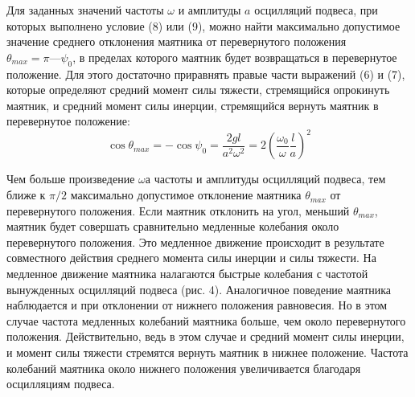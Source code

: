 \documentclass[a4paper,12pt]{article} %
\begin{document}
Для заданных значений частоты $\omega$ и амплитуды $a$ осцилляций подвеса, при которых выполнено условие (8) или (9), можно найти максимально допустимое значение среднего отклонения маятника от перевернутого положения $\theta_{max} = \pi — \psi_0$, в пределах которого маятник будет возвращаться в перевернутое положение. Для этого достаточно приравнять правые части выражений (6) и (7), которые определяют средний момент силы тяжести, стремящийся опрокинуть маятник, и средний момент силы инерции, стремящийся вернуть маятник в перевернутое положение:
\begin{equation}
\cos\theta_{max} = -\cos\psi_0 = \frac{2gl}{a^2\omega^2} = 2\left(\frac{\omega_0}{\omega} \frac{l}{a}\right)^2
\end{equation}

Чем больше произведение $\omega а$ частоты и амплитуды осцилляций подвеса, тем ближе к $\pi/2$ максимально допустимое отклонение маятника $\theta_{max}$ от перевернутого положения. Если маятник отклонить на угол, меньший $\theta_{max}$, маятник будет совершать сравнительно медленные колебания около перевернутого положения. Это медленное движение происходит в результате совместного действия среднего момента силы инерции и силы тяжести. На медленное движение маятника налагаются быстрые колебания с частотой вынужденных осцилляций подвеса (рис. 4).
Аналогичное поведение маятника наблюдается и при отклонении от нижнего положения равновесия. Но в этом случае частота медленных колебаний маятника больше, чем около перевернутого положения. Действительно, ведь в этом случае и средний момент силы инерции, и момент силы тяжести стремятся вернуть маятник в нижнее положение. Частота колебаний маятника около нижнего положения увеличивается благодаря осцилляциям подвеса.
\end{document}
